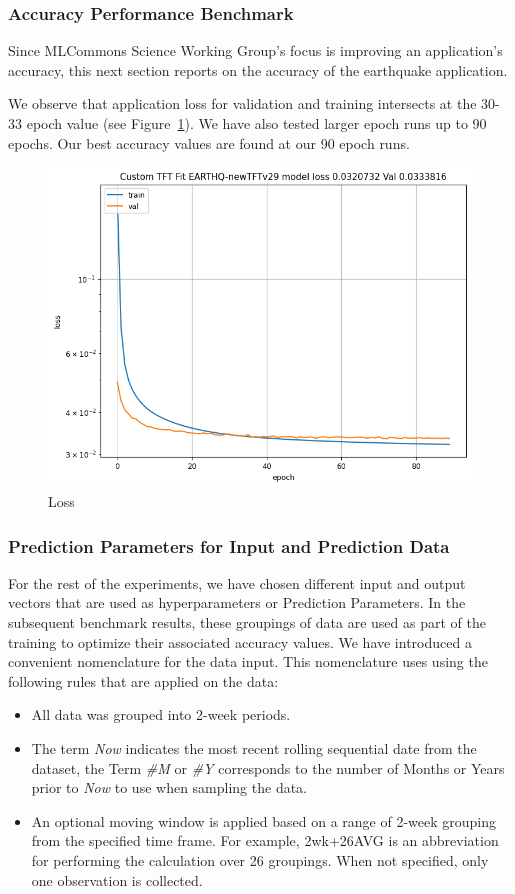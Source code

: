 \documentclass[utf8]{FrontiersinVancouver} %
\begin{document}
\subsubsection{Accuracy Performance Benchmark}
\label{sec:perf-accuracy}

Since MLCommons Science Working Group's focus is improving an
application’s accuracy, this next section reports on the accuracy of
the earthquake application.

We observe that
application loss for validation and training intersects at the 30-33
epoch value (see Figure~\ref{fig:loss}). We have also tested larger
epoch runs up to 90 epochs. Our best accuracy values are found at our
90 epoch runs. 

\begin{figure}[htb]
    \centering
    \includegraphics[width=0.70\columnwidth]{images/loss90.png}
    \caption{Loss}
    \label{fig:loss}
\end{figure}


\subsubsection{Prediction Parameters for Input and Prediction Data}

For the rest of the experiments, we have chosen different input and
output vectors that are used as hyperparameters or Prediction
Parameters.  In the subsequent benchmark results, these groupings of
data are used as part of the training to optimize their associated
accuracy values. We have introduced a convenient nomenclature for the
data input. This nomenclature uses using the following rules that are
applied on the data:

\begin{itemize}
  \item All data was grouped into 2-week periods.
  \item The term {\em Now} indicates the most recent rolling
    sequential date from the dataset, the Term {\em \#M} or {\em \#Y}
    corresponds to the number of Months or Years prior to {\em Now} to
    use when sampling the data.
  \item An optional moving window is applied based on a range of
    2-week grouping from the specified time frame.  For example,
    2wk+26AVG is an abbreviation for performing the calculation over
    26 groupings.  When not specified, only one observation is
    collected.
\end{itemize}
\end{document}
